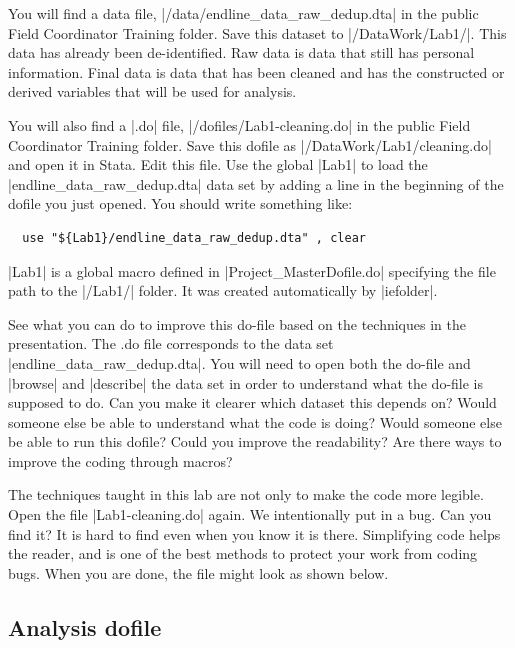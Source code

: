 \documentclass{tufte-handout}
\begin{document}
You will find a data file, |/data/endline_data_raw_dedup.dta|
in the public Field Coordinator Training folder.
Save this dataset to |/DataWork/Lab1/|.
This data has already been de-identified.
Raw data is data that still has personal information.
Final data is data that has been cleaned
and has the constructed or derived variables that will be used for analysis.

You will also find a |.do| file, |/dofiles/Lab1-cleaning.do|
in the public Field Coordinator Training folder.
Save this dofile as |/DataWork/Lab1/cleaning.do| and open it in Stata.
Edit this file.
Use the global |Lab1| to load the |endline_data_raw_dedup.dta| data set
by adding a line in the beginning of the dofile you just opened.
You should write something like:
\begin{Verbatim}
  use "${Lab1}/endline_data_raw_dedup.dta" , clear
\end{Verbatim}
|Lab1| is a global macro defined in |Project_MasterDofile.do|
specifying the file path to the |/Lab1/| folder.
It was created automatically by |iefolder|.

See what you can do to improve this do-file
based on the techniques in the presentation.
The .do file corresponds to the data set |endline_data_raw_dedup.dta|.
You will need to open both the do-file and |browse| and |describe|
the data set in order to understand what the do-file is supposed to do.
Can you make it clearer which dataset this depends on?
Would someone else be able to understand what the code is doing?
Would someone else be able to run this dofile?
Could you improve the readability?
Are there ways to improve the coding through macros?

The techniques taught in this lab are not only to make the code more legible.
Open the file |Lab1-cleaning.do| again.
We intentionally put in a bug. Can you find it?
It is hard to find even when you know it is there.
Simplifying code helps the reader,
and is one of the best methods to protect your work from coding bugs.
When you are done, the file might look as shown below.

\begin{figure}[h]
{
}
\end{figure}

\subsection{Analysis dofile}
\end{document}
